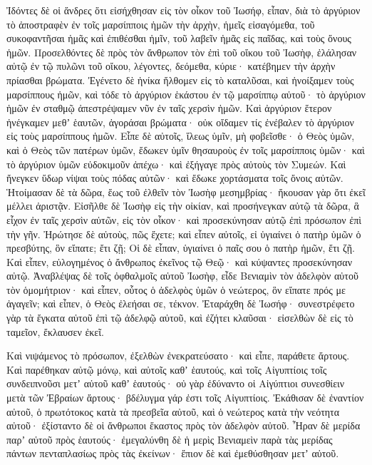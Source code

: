 {Ἰδόντες δὲ οἱ ἄνδρες ὅτι εἰσήχθησαν εἰς τὸν οἶκον τοῦ Ἰωσήφ, εἶπαν, διὰ τὸ ἀργύριον τὸ ἀποστραφὲν ἐν τοῖς μαρσίπποις ἡμῶν τὴν ἀρχὴν, ἡμεῖς εἰσαγόμεθα, τοῦ συκοφαντῆσαι ἡμᾶς καὶ ἐπιθέσθαι ἡμῖν, τοῦ λαβεῖν ἡμᾶς εἰς παῖδας, καὶ τοὺς ὄνους ἡμῶν.
Προσελθόντες δὲ πρὸς τὸν ἄνθρωπον τὸν ἐπὶ τοῦ οἴκου τοῦ Ἰωσὴφ, ἐλάλησαν αὐτῷ ἐν τῷ πυλῶνι τοῦ οἴκου,
λέγοντες, δεόμεθα, κύριε· κατέβημεν τὴν ἀρχὴν πρίασθαι βρώματα.
Ἐγένετο δὲ ἡνίκα ἤλθομεν εἰς τὸ καταλῦσαι, καὶ ἠνοίξαμεν τοὺς μαρσίππους ἡμῶν, καὶ τόδε τὸ ἀργύριον ἑκάστου ἐν τῷ μαρσίππῳ αὐτοῦ· τὸ ἀργύριον ἡμῶν ἐν σταθμῷ ἀπεστρέψαμεν νῦν ἐν ταῖς χερσὶν ἡμῶν.
Καὶ ἀργύριον ἕτερον ἠνέγκαμεν μεθʼ ἑαυτῶν, ἀγοράσαι βρώματα· οὐκ οἴδαμεν τίς ἐνέβαλεν τὸ ἀργύριον εἰς τοὺς μαρσίππους ἡμῶν.
Εἶπε δὲ αὐτοῖς, ἵλεως ὑμῖν, μὴ φοβεῖσθε· ὁ Θεὸς ὑμῶν, καὶ ὁ Θεὸς τῶν πατέρων ὑμῶν, ἔδωκεν ὑμῖν θησαυροὺς ἐν τοῖς μαρσίπποις ὑμῶν· καὶ τὸ ἀργύριον ὑμῶν εὐδοκιμοῦν ἀπέχω· καὶ ἐξήγαγε πρὸς αὐτοὺς τὸν Συμεών.
Καὶ ἤνεγκεν ὕδωρ νίψαι τοὺς πόδας αὐτῶν· καὶ ἔδωκε χορτάσματα τοῖς ὄνοις αὐτῶν.
Ἡτοίμασαν δὲ τὰ δῶρα, ἕως τοῦ ἐλθεῖν τὸν Ἰωσὴφ μεσημβρίας· ἤκουσαν γὰρ ὅτι ἐκεῖ μέλλει ἀριστᾷν.
Εἰσῆλθε δὲ Ἰωσὴφ εἰς τὴν οἰκίαν, καὶ προσήνεγκαν αὐτῷ τὰ δῶρα, ἃ εἶχον ἐν ταῖς χερσὶν αὐτῶν, εἰς τὸν οἶκον· καὶ προσεκύνησαν αὐτῷ ἐπὶ πρόσωπον ἐπὶ τὴν γῆν.
Ἠρώτησε δὲ αὐτοὺς, πῶς ἔχετε; καὶ εἶπεν αὐτοῖς, εἰ ὑγιαίνει ὁ πατὴρ ὑμῶν ὁ πρεσβύτης, ὃν εἴπατε; ἔτι ζῇ;
Οἱ δὲ εἶπαν, ὑγιαίνει ὁ παῖς σου ὁ πατὴρ ἡμῶν, ἔτι ζῇ. Καὶ εἶπεν, εὐλογημένος ὁ ἄνθρωπος ἐκεῖνος τῷ Θεῷ· καὶ κύψαντες προσεκύνησαν αὐτῷ.
Ἀναβλέψας δὲ τοῖς ὀφθαλμοῖς αὐτοῦ Ἰωσὴφ, εἶδε Βενιαμὶν τὸν ἀδελφὸν αὐτοῦ τὸν ὁμομήτριον· καὶ εἶπεν, οὗτος ὁ ἀδελφὸς ὑμῶν ὁ νεώτερος, ὃν εἴπατε πρός με ἀγαγεῖν; καὶ εἶπεν, ὁ Θεὸς ἐλεήσαι σε, τέκνον.
Ἐταράχθη δὲ Ἰωσήφ· συνεστρέφετο γὰρ τὰ ἔγκατα αὐτοῦ ἐπὶ τῷ ἀδελφῷ αὐτοῦ, καὶ ἐζήτει κλαῦσαι· εἰσελθὼν δὲ εἰς τὸ ταμεῖον, ἔκλαυσεν ἐκεῖ.
\par }{\PP {}Καὶ νιψάμενος τὸ πρόσωπον, ἐξελθὼν ἐνεκρατεύσατο· καὶ εἶπε, παράθετε ἄρτους.
Καὶ παρέθηκαν αὐτῷ μόνῳ, καὶ αὐτοῖς καθʼ ἑαυτούς, καὶ τοῖς Αἰγυπτίοις τοῖς συνδειπνοῦσι μετʼ αὐτοῦ καθʼ ἑαυτούς· οὐ γὰρ ἐδύναντο οἱ Αἰγύπτιοι συνεσθίειν μετὰ τῶν Ἐβραίων ἄρτους· βδέλυγμα γάρ ἐστι τοῖς Αἰγυπτίοις.
Ἐκάθισαν δὲ ἐναντίον αὐτοῦ, ὁ πρωτότοκος κατὰ τὰ πρεσβεῖα αὐτοῦ, καὶ ὁ νεώτερος κατὰ τὴν νεότητα αὐτοῦ· ἐξίσταντο δὲ οἱ ἄνθρωποι ἕκαστος πρὸς τὸν ἀδελφὸν αὐτοῦ.
Ἦραν δὲ μερίδα παρʼ αὐτοῦ πρὸς ἑαυτούς· ἐμεγαλύνθη δὲ ἡ μερὶς Βενιαμεὶν παρὰ τὰς μερίδας πάντων πενταπλασίως πρὸς τὰς ἐκείνων· ἔπιον δὲ καὶ ἐμεθύσθησαν μετʼ αὐτοῦ.

}
